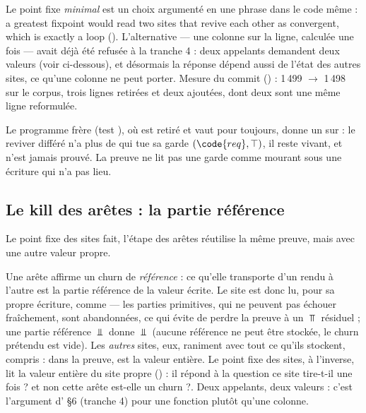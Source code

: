 \begin{decision}
Le point fixe \emph{minimal} est un choix argumenté en une phrase dans le code même :
\og a greatest fixpoint would read two sites that revive each other as convergent, which
is exactly a loop\fg{} (). L'alternative --- une colonne
 sur la ligne, calculée une fois --- avait déjà été refusée à la tranche 4 :
deux appelants demandent deux valeurs (voir ci-dessous), et désormais la réponse dépend
aussi de l'état des autres sites, ce qu'une colonne ne peut porter. Mesure du commit
\snapshotCommit{} () : 1\,499 $\to$ 1\,498 sur le corpus, trois
lignes retirées et deux ajoutées, dont deux sont une même ligne reformulée.
\end{decision}

Le programme frère  (test
), où  est retiré et
 vaut  pour toujours, donne un \Warning{} sur  : le
reviver différé n'a plus de  qui tue sa garde $(\code{req}, \top)$, il reste vivant,
et  n'est jamais prouvé. La preuve ne lit pas une garde comme
mourant sous une écriture qui n'a pas lieu.

\subsection{Le kill des arêtes : la partie référence}

Le point fixe des sites fait, l'étape des arêtes réutilise la même preuve, mais avec une
autre valeur propre.



Une arête affirme un churn de \emph{référence} : ce qu'elle transporte d'un rendu à l'autre
est la partie référence de la valeur écrite. Le site est donc lu, pour sa propre écriture,
comme  --- les parties primitives, qui ne peuvent
pas échouer  fraîchement, sont abandonnées, ce qui évite de perdre la
preuve à un $\Top$ résiduel ; une partie référence $\Bot$ donne $\Bot$ (aucune référence
ne peut être stockée, le churn prétendu est vide). Les \emph{autres} sites, eux, raniment avec
tout ce qu'ils stockent,  compris : dans la preuve,  est la
valeur entière. Le point fixe des sites, à l'inverse, lit la valeur entière du site propre
() : il répond à la question \og ce site tire-t-il une fois ?\fg{} et
non \og cette arête est-elle un churn ?\fg. Deux appelants, deux valeurs : c'est
l'argument d' \S6 (tranche 4) pour une fonction plutôt qu'une colonne.

